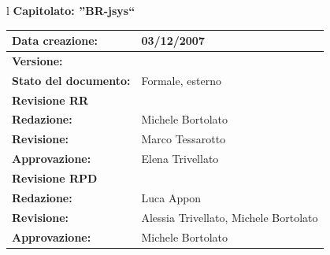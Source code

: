 \documentclass[11pt,titlepage,a4paper]{report}
\begin{document}
\begin{center}
\thispagestyle{plain}
\begin{table}[htbp]
\large{
\begin{tabular}{l}
\Large{\textbf{\textsf{Capitolato: ''BR-jsys``}}} \\
\begin{tabular}{||p{6cm}||p{6cm}||}
\hline
\textbf{Data creazione:} & 03/12/2007 \\ \hline
\textbf{Versione:} & \lv \\ \hline
\textbf{Stato del documento:} & Formale, esterno \\ \hline
\textbf{Revisione RR} & \\ \hline
\textbf{Redazione:} & Michele Bortolato\\ \hline
\textbf{Revisione:} & Marco Tessarotto\\ \hline
\textbf{Approvazione:}  & Elena Trivellato\\ \hline
\textbf{Revisione RPD} & \\ \hline
\textbf{Redazione:} & Luca Appon \\ \hline
\textbf{Revisione:} & Alessia Trivellato, Michele Bortolato  \\ \hline
\textbf{Approvazione:}  & Michele Bortolato \\ \hline
\end{tabular} \\
\end{tabular}
}
\end{table}


\end{center}
\end{document}
